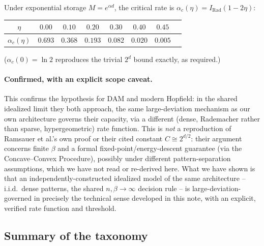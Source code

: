 \documentclass[11pt]{article}
\newcommand{\toprule}{\hline\hline}
\newcommand{\midrule}{\hline}
\newcommand{\bottomrule}{\hline\hline}
\begin{document}
Under exponential storage $M=e^{\alpha d}$, the critical rate is $\alpha_c(\eta)=I_{\mathrm{Rad}}(1-2\eta)$:

\begin{center}
\begin{tabular}{cccccccc}
\toprule
$\eta$ & $0.00$ & $0.10$ & $0.20$ & $0.30$ & $0.40$ & $0.45$ \\
\midrule
$\alpha_c(\eta)$ & $0.693$ & $0.368$ & $0.193$ & $0.082$ & $0.020$ & $0.005$ \\
\bottomrule
\end{tabular}
\end{center}
\noindent($\alpha_c(0)=\ln2$ reproduces the trivial $2^d$ bound exactly, as required.)

\paragraph{Confirmed, with an explicit scope caveat.} This confirms the hypothesis for DAM and
modern Hopfield: in the shared idealized limit they both approach, the same large-deviation
mechanism as our own architecture governs their capacity, via a different (dense, Rademacher
rather than sparse, hypergeometric) rate function. This is \emph{not} a reproduction of Ramsauer
et al.'s own proof or their cited constant $C\cong2^{d/2}$: their argument concerns finite $\beta$
and a formal fixed-point/energy-descent guarantee (via the Concave--Convex Procedure), possibly
under different pattern-separation assumptions, which we have not read or re-derived here. What
we have shown is that an independently-constructed idealized model of the same architecture --
i.i.d.\ dense patterns, the shared $n,\beta\to\infty$ decision rule -- is large-deviation-governed
in precisely the technical sense developed in this note, with an explicit, verified rate function
and threshold.

\subsection{Summary of the taxonomy}
\end{document}
